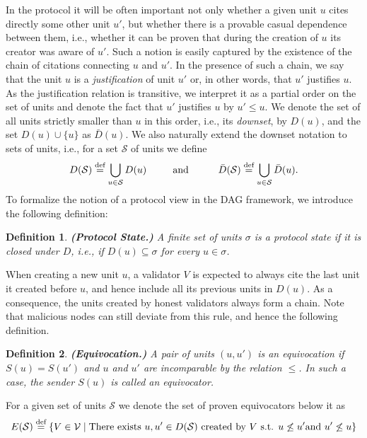 \documentclass[12pt, fleqn]{article}
\newtheorem{definition}{Definition}
\newcommand{\defeq}{\stackrel{\textup{def}}{=}}
\newcommand{\cS}{\mathcal{S}}
\begin{document}
In the protocol it will be often important not only whether a given unit $u$ cites directly some other unit $u'$, but whether there is a provable casual dependence between them, i.e., whether it can be proven that during the creation of $u$ its creator was aware of $u'$.
%
Such a notion is easily captured by the existence of the chain of citations connecting $u$ and $u'$.
%
In the presence of such a chain, we say that the unit $u$ is a  \emph{justification} of unit $u'$ or, in other words, that $u'$ justifies $u$.
%
As the justification relation is transitive, we interpret it as a partial order on the set of units and denote the fact that $u'$ justifies $u$ by $u'\leq u$.
%
We denote the set of all units strictly smaller than $u$ in this order, i.e., its \emph{downset}, by $D(u)$, and the set $D(u)\cup\{u\}$ as $\bar{D}(u)$.
%
We also naturally extend the downset notation to sets of units, i.e., for a set $\cS$ of units we define
$$D(\cS) \defeq \bigcup_{u\in \cS} D(u)~~~~~~~\mbox{ and }~~~~~~~~\bar{D}(\cS) \defeq \bigcup_{u\in \cS} \bar{D}(u).$$
%
To formalize the notion of a protocol view in the DAG framework, we introduce the following definition:

\begin{definition} {\bf (Protocol State.)}
A finite set of units $\sigma$ is a \emph{protocol state} if it is closed under $D$, i.e., if $D(u)\subseteq \sigma$ for every $u\in\sigma$.
\end{definition}


When creating a new unit $u$, a validator $V$ is expected to always cite the last unit it created before $u$, and hence include all its previous units in $D(u)$.
%
As a consequence, the units created by honest validators always form a chain.
%
Note that malicious nodes can still deviate from this rule, and hence the following definition.

\begin{definition}{\bf (Equivocation.)}
A pair of units $(u,u')$ is an \emph{equivocation} if $S(u)=S(u')$ and $u$ and $u'$ are incomparable by the relation $\leq$. In such a case, the sender $S(u)$ is called an \emph{equivocator}.
\end{definition}


For a given set of units $\cS$ we denote the set of proven equivocators below it as $$E(\cS) \defeq \{V\in \mathcal{V} \mid \text{There exists } u,u'\in D(\cS) \text{ created by } V \text{ s.t. } u\not\leq u' \text{and } u'\not\leq u\}$$
\end{document}
